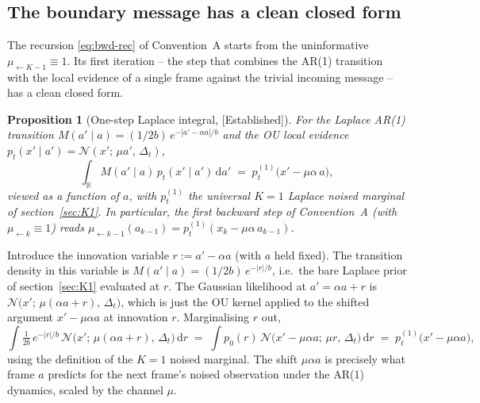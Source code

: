 \documentclass[11pt]{article}
\newtheorem{proposition}{Proposition}
\theoremstyle{definition}
\newcommand{\R}{\mathbb{R}}
\newcommand{\Detl}{\Delta_t}
\newcommand{\Established}{\textcolor{black!50!green}{\textsf{[Established]}}}
\begin{document}
\subsection{The boundary message has a clean closed form}\label{sec:K2-boundary}

The recursion \eqref{eq:bwd-rec} of Convention~A starts from the
uninformative \(\mu_{\leftarrow K - 1} \equiv 1\). Its first
iteration -- the step that combines the AR(1) transition with the
local evidence of a single frame against the trivial incoming message
-- has a clean closed form.

\begin{proposition}[One-step Laplace integral, \Established]\label{prop:forward-K2}
For the Laplace AR(1) transition
\(M(a' \mid a) = (1/2 b)\, e^{-|a' - \alpha a| / b}\) and the OU local
evidence \(p_t(x' \mid a') = \mathcal N(x';\, \mu a',\, \Detl)\),
\begin{equation}\label{eq:one-step-laplace}
    \int_{\R} M(a' \mid a)\, p_t(x' \mid a')\, \mathrm d a'
    \;=\;
    p_t^{(1)}\!\bigl(x' - \mu \alpha\, a\bigr),
\end{equation}
viewed as a function of \(a\), with \(p_t^{(1)}\) the universal
\(K = 1\) Laplace noised marginal of section~\ref{sec:K1}.
In particular, the first backward step of Convention~A (with
\(\mu_{\leftarrow k} \equiv 1\)) reads
\(\mu_{\leftarrow k-1}(a_{k-1}) = p_t^{(1)}(x_k - \mu \alpha\, a_{k-1})\).
\end{proposition}

\begin{derivation}
Introduce the innovation variable \(r := a' - \alpha a\) (with \(a\)
held fixed). The transition density in this variable is
\(M(a' \mid a) = (1/2 b)\, e^{-|r| / b}\), i.e.\ the bare Laplace
prior of section~\ref{sec:K1} evaluated at \(r\). The Gaussian
likelihood at \(a' = \alpha a + r\) is
\(\mathcal N\!\bigl(x';\, \mu(\alpha a + r),\, \Detl\bigr)\),
which is just the OU kernel applied to the shifted argument
\(x' - \mu \alpha a\) at innovation \(r\). Marginalising \(r\) out,
\begin{equation}
    \int \tfrac{1}{2 b}\, e^{-|r|/b}\,
        \mathcal N\!\bigl(x';\, \mu(\alpha a + r),\, \Detl\bigr)\,
        \mathrm d r
    \;=\;
    \int p_0(r)\, \mathcal N\!\bigl(x' - \mu \alpha a;\, \mu r,\, \Detl\bigr)\,
        \mathrm d r
    \;=\;
    p_t^{(1)}\!\bigl(x' - \mu \alpha a\bigr),
\end{equation}
using the definition of the \(K = 1\) noised marginal. The shift
\(\mu \alpha a\) is precisely what frame \(a\) predicts for the next
frame's noised observation under the AR(1) dynamics, scaled by the
channel \(\mu\).
\end{derivation}
\end{document}
